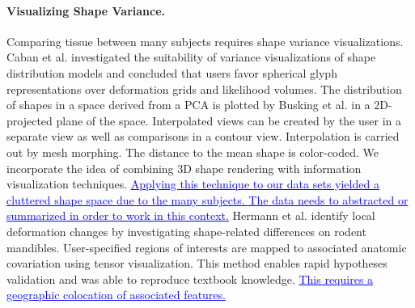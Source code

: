 \documentclass[journal]{style/vgtc} 			          %
\newcommand{\add}[1]{\textcolor{blue}{\uline{#1}}}
\begin{document}
\paragraph{Visualizing Shape Variance.}
Comparing tissue between many subjects requires shape variance visualizations.
%
Caban et al. \cite{Caban2011} investigated the suitability of variance visualizations of shape distribution models and concluded that users favor spherical glyph representations over deformation grids and likelihood volumes.
%
The distribution of shapes in a space derived from a PCA is plotted by Busking et al. \cite{Busking2010a} in a 2D-projected plane of the space.
%
Interpolated views can be created by the user in a separate view as well as comparisons in a contour view.
%
Interpolation is carried out by mesh morphing.
%
The distance to the mean shape is color-coded.
%
We incorporate the idea of combining 3D shape rendering with information visualization techniques.
%
\add{Applying this technique to our data sets yielded a cluttered shape space due to the many subjects.
%
The data needs to abstracted or summarized in order to work in this context.}
%
Hermann et al. \cite{Hermann2014} identify local deformation changes by investigating shape-related differences on rodent mandibles.
%
User-specified regions of interests are mapped to associated anatomic covariation using tensor visualization.
%
This method enables rapid hypotheses validation and was able to reproduce textbook knowledge.
%
%
\add{This requires a geographic colocation of associated features.}
%

\end{document}
